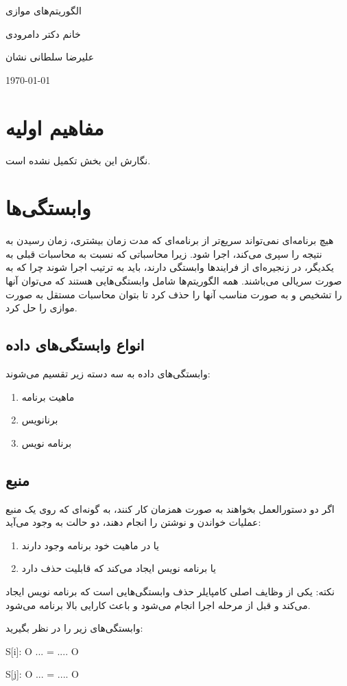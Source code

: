 \documentclass[20pt, a4paper]{article}
\begin{document}
\centerline{الگوریتم‌های موازی}
\centerline {خانم دکتر دامرودی}
\centerline{علیرضا سلطانی نشان}
\centerline{\today}

\tableofcontents

\section{مفاهیم اولیه}

نگارش این بخش تکمیل نشده است.

\section{وابستگی‌ها}

هیچ برنامه‌ای نمی‌تواند سریع‌تر از برنامه‌ای که مدت زمان بیشتری، زمان رسیدن به
نتیجه را سپری می‌‌کند، اجرا شود. زیرا محاسباتی که نسبت به محاسبات قبلی به
یکدیگر، در زنجیره‌ای از فرایند‌ها وابستگی دارند، باید به ترتیب اجرا شوند چرا که
به صورت سریالی می‌باشند.  همه الگوریتم‌ها شامل وابستگی‌هایی هستند که می‌توان
آنها را تشخیص و به صورت مناسب آنها را حذف کرد تا بتوان محاسبات مستقل به صورت
موازی را حل کرد.

\subsection{انواع وابستگی‌های داده}

وابستگی‌های داده به سه دسته زیر تقسیم می‌شوند:

\begin{enumerate}
    \item {} ماهیت برنامه
    \item {} برنانویس
    \item {} برنامه نویس
\end{enumerate}

\subsection{منبع} 

اگر دو دستورالعمل بخواهند به صورت همزمان کار کنند، به گونه‌ای که روی یک منبع
عملیات خواندن و نوشتن را انجام دهند، دو حالت به وجود می‌آید:

\begin{enumerate}
    \item یا در ماهیت خود برنامه وجود دارند
    \item یا برنامه نویس ایجاد می‌کند که قابلیت حذف دارد
\end{enumerate}

نکته: یکی از وظایف اصلی کامپایلر حذف وابستگی‌هایی است که برنامه نویس ایجاد
می‌کند و قبل از مرحله اجرا انجام می‌شود و باعث کارایی بالا برنامه می‌شود.


وابستگی‌های زیر را در نظر بگیرید:

S[i]: O ... = .... O

S[j]: O ... = .... O
\end{document}
